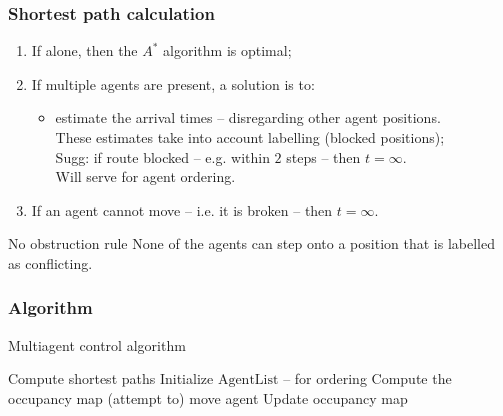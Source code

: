 \documentclass[12pt,aspectratio=169]{beamer}
\begin{document}
\begin{frame}[t]
  \frametitle{Shortest path calculation}

\begin{enumerate}
\item If alone, then the $A^*$ algorithm is optimal;
\vfill
\item If multiple agents are present, a solution is to:
  \begin{itemize}
  \item estimate the arrival times -- disregarding \alert{other agent positions}.\\
  \hfill These estimates take into account labelling (blocked positions);\\
  \hfill Sugg: if route blocked -- e.g. within $2$ steps -- then $t=\infty$.\\
  \hfill Will serve for agent ordering.
  \end{itemize}
\vfill
\item If an agent cannot move -- i.e. it is broken -- then $t=\infty$.
\end{enumerate}

\vfill
\vfill

\begin{block}{No obstruction rule}
  None of the agents can step onto a position that is labelled as conflicting.
\end{block}

\end{frame}

\begin{frame}[fragile,t]
  \frametitle{Algorithm}

\vspace*{-.5cm}
\hfill
\begin{minipage}{.8\linewidth}
  \begin{alertblock}{Multiagent control algorithm}
  \begin{algorithmic}[1]
  \Statex
  \State Compute shortest paths
  \State Initialize $\mathrm{AgentList}$ -- for ordering
  \State Compute the \alert{occupancy} map
  \Statex {}
    \State (attempt to) move agent
    \Statex {}
    \State Update occupancy map
  \EndFor  
  \EndWhile
  \end{algorithmic}
  \end{alertblock}
\end{minipage}

\end{frame}
\end{document}
